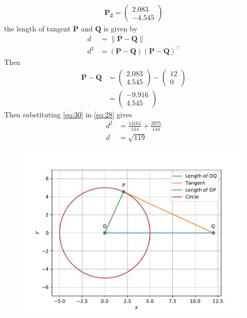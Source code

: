 \documentclass[12pt]{article}
\providecommand{\norm}[1]{\left\lVert#1\right\rVert}
\newcommand{\myvec}[1]{\ensuremath{\begin{pmatrix}#1\end{pmatrix}}}
\let\vec\mathbf
\begin{document}
\begin{enumerate}
\begin{align}
\vec{P_2} = \myvec{2.083 \\ -4.545}
\end{align}
the length of tangent $\vec{P}$ and $\vec{Q}$ is given by
\begin{align}
d&=\norm{\vec{P}-\vec{Q}}\\
	d^2&=(\vec{P}-\vec{Q})(\vec{P}-\vec{Q})^{\top}\label{eq:28}
\end{align}
Then
\begin{align}
	\vec{P}-\vec{Q}&=\myvec{2.083\\4.545}-\myvec{12\\0}\\
	&=\myvec{-9.916\\4.545}\label{eq:30}
\end{align}
Then substituting \eqref{eq:30} in \eqref{eq:28} gives
\begin{align}
	d^2&=\frac{14161}{144}+\frac{2975}{144}\\
	d&=\sqrt{119}
\end{align}
\begin{figure}[!h]
 \begin{center}
 \includegraphics[width=\columnwidth]{figs/fig.pdf}
 \end{center}
\caption{}
\label{fig:Fig1}
\end{figure}
\end{enumerate}
\end{document}
